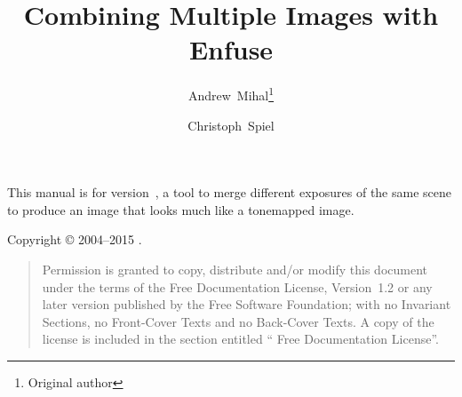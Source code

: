 

\begin{titlepage}
  \renewcommand{\thefootnote}{\fnsymbol{footnote}}

  \author{Andrew~Mihal\footnote{Original author} \and Christoph~Spiel}

  \title{Combining Multiple Images with Enfuse }

  \date{}

  \maketitle
\end{titlepage}


\vspace*{\fill}
\ifhevea\relax\else \begin{center}\end{center}\fi
\label{sec:abstract}\noindent This manual is for \App{}
version~, a tool to merge different exposures of the
same scene to produce an image that looks much like a tonemapped
image.

\vspace*{\fill}
\noindent Copyright \copyright{} 2004--2015 .

\begin{quotation}
  \noindent Permission is granted to copy, distribute and/or modify
  this document under the terms of the  Free
  Documentation License, Version~1.2 or any later version published by
  the Free Software Foundation; with no Invariant Sections, no
  Front-Cover Texts and no Back-Cover Texts.  A copy of the license is
  included in the section entitled `` Free Documentation
  License''.
\end{quotation}

\cleardoublepage{}
